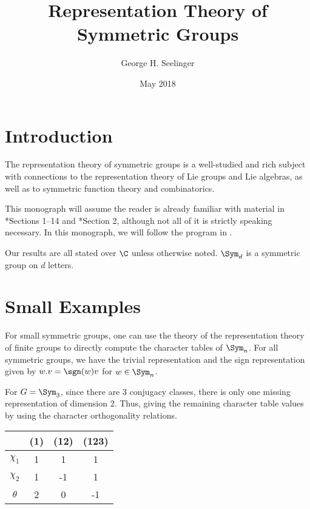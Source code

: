 \documentclass[11pt,leqno,oneside]{amsart}
\title[Representation Theory of Symmetric Groups]{Representation
  Theory of Symmetric Groups}
\author{George H. Seelinger}
\date{May 2018}
\numberwithin{thm}{section}
\begin{document}
\maketitle
\section{Introduction}
The representation theory of symmetric groups is a well-studied and
rich subject with connections to the representation theory of Lie
groups and Lie algebras, as well as to symmetric function theory and
combinatorics.

This monograph will assume the reader is already familiar with
material in \cite{rep-thry-of-finite-gps}*{Sections 1--14} and
\cite{alg-comb}*{Section 
2}, 
although not all of it is 
strictly speaking necessary. In this monograph, we will follow the
program in
\cite{fulton-harris}.

Our results are all stated over \(\C\) unless otherwise
noted. \(\Sym_d\) is a symmetric group on \(d\) letters.
\section{Small Examples}
For small symmetric groups, one can use the theory of the
representation theory of finite groups to directly compute the
character tables of \(\Sym_n\). For all symmetric groups, we have the
trivial representation and the sign representation given by \(w.v =
\sgn(w)v\) for \(w \in \Sym_n\). 
\begin{example}
  For \(G = \Sym_3\), since there are \(3\) conjugacy classes, there
  is only one missing representation of dimension \(2\). Thus, giving
  the remaining character table values by using the character
  orthogonality relations.
  \begin{center}
    \begin{tabular}{c|ccc}
      &(1)&(12)&(123) \\
      \hline
      \(\chi_1\) &1&1&1 \\
      \(\chi_2\) &1&-1&1\\
      \(\theta\) &2&0&-1
    \end{tabular}
  \end{center}
\end{example}
\end{document}
